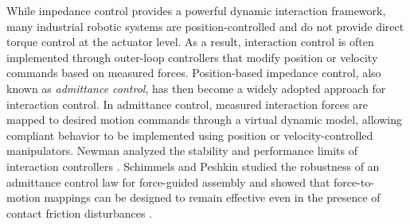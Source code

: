 \documentclass[journal]{IEEEtran}
\begin{document}
While impedance control provides a powerful dynamic interaction framework, many industrial robotic systems are position-controlled and do not provide direct torque control at the actuator level. As a result, interaction control is often implemented through outer-loop controllers that modify position or velocity commands based on measured forces. %
Position-based impedance control, also known as 
\emph{admittance control}, has then become a widely adopted approach for interaction control. In admittance control, measured interaction forces are mapped to desired motion commands through a virtual dynamic model, allowing compliant behavior to be implemented using position or velocity-controlled manipulators. Newman analyzed the stability and performance limits of interaction controllers \cite{Newman1992}.
Schimmels and Peshkin studied the robustness of an admittance control law for force-guided assembly and showed that force-to-motion mappings can be designed to remain effective even in the presence of contact friction disturbances \cite{Peshkin1992}.
\end{document}
